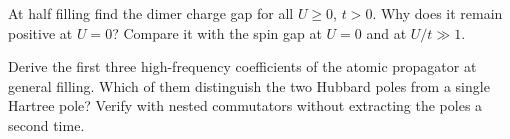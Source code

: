 \begin{exercise}\label{ex:gaps}
At half filling find the dimer charge gap for all $U\ge0$, $t>0$.
Why does it remain positive at $U=0$? Compare it with the spin gap
at $U=0$ and at $U/t\gg1$.
\end{exercise}

\begin{exercise}\label{ex:moments}
Derive the first three high-frequency coefficients of the atomic
propagator at general filling. Which of them distinguish the two
Hubbard poles from a single Hartree pole? Verify with nested
commutators without extracting the poles a second time.
\end{exercise}
